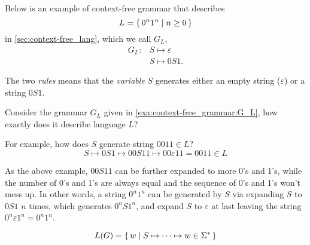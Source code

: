 \begin{example}
    \label{exa:context-free_grammar:G_L}
    Below is an example of context-free grammar that describes 
    \[
        L = { \left\{\, 0^n 1^n \mid n \ge 0 \,\right\} }
    \]
    in \autoref{sec:context-free_lang}, which we call $G_L$,
    \begin{align*}
        G_L \colon & S \mapsto \varepsilon \\
                   & S \mapsto 0S1
    .\end{align*}

    The two \emph{rules} means that the \emph{variable} $S$ generates either an empty
    string ($\varepsilon$) or a string $0S1$.
\end{example}

\begin{example}
    Consider the grammar $G_L$ given in \autoref{exa:context-free_grammar:G_L},
    how exactly does it describe language $L$?

    For example, how does $S$ generate string $0011 \in L$?
    \[
        S \mapsto 0S1 \mapsto 00S11 \mapsto 00\varepsilon11 = 0011 \in L
    \]

    As the above example, $00S11$ can be further expanded to more 0's and 1's, while the
    number of 0's and 1's are always equal and the sequence of 0's and 1's won't mess up.
    In other words,
    a string $0^n 1^n$ can be generated by $S$ via
    expanding $S$ to $0S1$ $n$ times, which generates $0^n S 1^n$, and expand $S$ to
    $\varepsilon$ at last leaving the string $0^n \varepsilon 1^n = 0^n 1^n$.
\end{example}

\[
    L(G) = { \left\{\, w \mid S \mapsto \cdots \mapsto w \in \Sigma^* \,\right\} }
\]

% 
% 
% 
